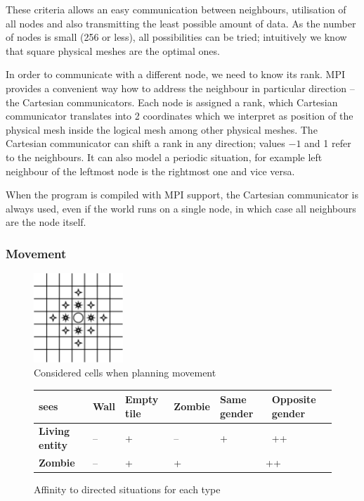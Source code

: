 \documentclass[a4paper]{article}
\begin{document}
These criteria allows an easy communication between neighbours, utilisation of all nodes and also transmitting the least possible amount of data.
As the number of nodes is small (256 or less), all possibilities can be tried; intuitively we know that square physical meshes are the optimal ones.

In order to communicate with a different node, we need to know its rank.
MPI provides a convenient way how to address the neighbour in particular direction -- the Cartesian communicators.
Each node is assigned a rank, which Cartesian communicator translates into 2 coordinates which we interpret as position of the physical mesh inside the logical mesh among other physical meshes.
The Cartesian communicator can shift a rank in any direction; values $-1$ and 1 refer to the neighbours.
It can also model a periodic situation, for example left neighbour of the leftmost node is the rightmost one and vice versa.

When the program is compiled with MPI support, the Cartesian communicator is always used, even if the world runs on a single node, in which case all neighbours are the node itself.

\subsubsection{Movement}

\begin{figure}[ht]
    \centering
    \includegraphics[width=0.3\textwidth]{movement}
    \caption{Considered cells when planning movement}
\end{figure}

\begin{figure}[ht]
    \centering
    \begin{tabu} {| X[1.8,c,p] || X[1,c,p] | X[1,c,p] | X[1,c,p] | X[1,c,p] | X[1.2,c,p] |}
        \rowfont{\bfseries}
        \hline
        sees &
        Wall\footnotemark &
        Empty tile&
        Zombie &
        Same gender &
        Opposite gender \\
        \hline
        \hline
        \textbf{Living entity} & -- & + & -- & + & ++ \\
        \hline
        \textbf{Zombie} & -- & + & + &  \\
        \hline
    \end{tabu}
    \caption{Affinity to directed situations for each type}
\end{figure}
\end{document}
